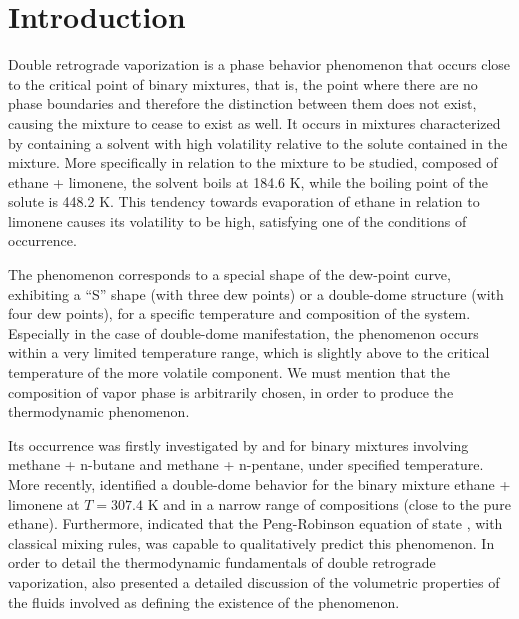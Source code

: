 \documentclass[journal=iecred,manuscript=article]{achemso}
\theoremstyle{definition}
\theoremstyle{remark}
\begin{document}
\section{Introduction}

Double retrograde vaporization is a phase behavior phenomenon that occurs close to the critical point of binary mixtures, that is, the point where there are no phase boundaries and therefore the distinction between them does not exist, causing the mixture to cease to exist as well. It occurs in mixtures characterized by containing a solvent with high volatility relative to the solute contained in the mixture. More specifically in relation to the mixture to be studied, composed of ethane + limonene, the solvent boils at 184.6 K, while the boiling point of the solute is 448.2 K. This tendency towards evaporation of ethane in relation to limonene causes its volatility to be high, satisfying one of the conditions of occurrence.

The phenomenon corresponds to a special shape of the dew-point curve, exhibiting a \enquote{S} shape (with three dew points) or a double-dome structure (with four dew points), for a specific temperature and composition of the system. Especially in the case of double-dome manifestation, the phenomenon occurs within a very limited temperature range, which is slightly above to the critical temperature of the more volatile component. We must mention that the composition of vapor phase is arbitrarily chosen, in order to produce the thermodynamic phenomenon.

Its occurrence was firstly investigated by \citet{chen_1} and \citet{chen_2} for binary mixtures involving methane + n-butane and methane + n-pentane, under specified temperature. More recently, \citet{raeissi_1} identified a double-dome behavior for the binary mixture ethane + limonene at $T = 307.4$ K and in a narrow range of compositions (close to the pure ethane). Furthermore, \citet{raeissi_2} indicated that the Peng-Robinson equation of state \citep{peng_robinson}, with classical mixing rules, was capable to qualitatively predict this phenomenon. In order to detail the thermodynamic fundamentals of double retrograde vaporization, \citet{raeissi2004thermodynamic} also presented a detailed discussion of the volumetric properties of the fluids involved as defining the existence of the phenomenon.
\end{document}
